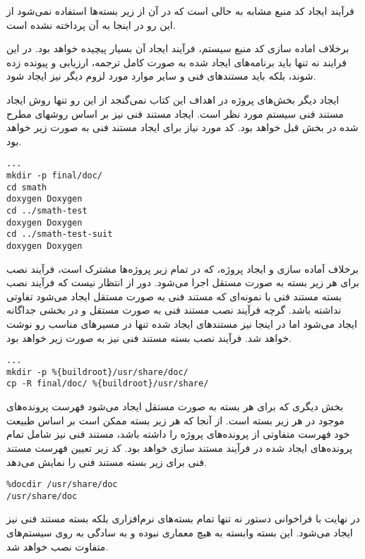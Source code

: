 \begin{note}
فرآیند ایجاد کد منبع مشابه به حالی است که در آن از زیر بسته‌ها استفاده نمی‌شود
از این رو در اینجا به آن پرداخته نشده است.
\end{note}

برخلاف اماده سازی کد منبع سیستم، فرآیند ایجاد آن بسیار پیچیده خواهد بود. در این
فرایند نه تنها باید برنامه‌های ایجاد شده به صورت کامل ترجمه، ارزیابی و پیونده
زده شوند، بلکه باید مستندهای فنی و سایر موارد مورد لزوم دیگر نیز ایجاد شود.

ایجاد دیگر بخش‌های پروژه در اهداف این کتاب نمی‌گنجد از این رو تنها روش ایجاد
مستند فنی سیستم مورد نظر است. ایجاد مستند فنی نیز بر اساس روشهای مطرح شده در
بخش قبل خواهد بود. کد مورد نیاز برای ایجاد مستند فنی به صورت زیر خواهد بود.

\begin{latin}
\lstset{language=TeX}  
\begin{lstlisting}[frame=single] 
%build
...
mkdir -p final/doc/
cd smath
doxygen Doxygen
cd ../smath-test
doxygen Doxygen
cd ../smath-test-suit
doxygen Doxygen
\end{lstlisting}
\end{latin}

برخلاف آماده سازی و ایجاد پروژه، که در تمام زیر پروژه‌ها مشترک است، فرآیند نصب
برای هر زیر بسته به صورت مستقل اجرا می‌شود. دور از انتظار نیست که فرآیند نصب
بسته مستند فنی با نمونه‌ای که مستند فنی به صورت مستقل ایجاد می‌شود تفاوتی نداشته
باشد. گرچه فرآیند نصب مستند فنی به صورت مستقل و در بخشی جداگانه ایجاد می‌شود اما
در اینجا نیز مستندهای ایجاد شده تنها در مسیرهای مناسب رو نوشت خواهد شد. فرآیند
نصب بسته مستند فنی نیز به صورت زیر خواهد بود.

\begin{latin}
\lstset{language=TeX}  
\begin{lstlisting}[frame=single] 
%install doc
...
mkdir -p %{buildroot}/usr/share/doc/
cp -R final/doc/ %{buildroot}/usr/share/
\end{lstlisting}
\end{latin}

بخش دیگری که برای هر بسته به صورت مستقل ایجاد می‌شود فهرست پرونده‌های موجود در
هر زیر بسته است. از آنجا که هر زیر بسته ممکن است بر اساس طبیعت خود فهرست متفاوتی
از پرونده‌های پروژه را داشته باشد، مستند فنی نیز شامل تمام پرونده‌های ایجاد شده
در فرآیند مستند سازی خواهد بود. کد زیر تعیین فهرست مستند فنی برای زیر بسته مستند
فنی را نمایش می‌دهد.

\begin{latin}
\lstset{language=TeX}  
\begin{lstlisting}[frame=single] 
%files doc
%docdir /usr/share/doc
/usr/share/doc
\end{lstlisting}
\end{latin}

در نهایت با فراخوانی دستور  نه تنها تمام بسته‌های نرم‌افزاری بلکه
بسته مستند فنی نیز ایجاد می‌شود. این بسته وابسته به هیچ معماری نبوده و به سادگی
به روی سیستم‌های متفاوت نصب خواهد شد.


